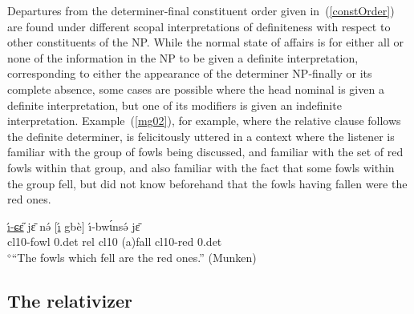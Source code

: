 \documentclass[10pt,twoside]{article}
\makeatletter
\newcommand{\cl}[1]{{\sc cl#1}}
\def\elicited{$^\diamond$}
\renewcommand{\i}{ı}
\def\@{ə}
\def\eh{ɛ}
\def\ih{ɩ}
\def\sh{ɕ}
\makeatother
\begin{document}
Departures from the determiner-final
constituent order given in~(\ref{constOrder})
are found
under different scopal interpretations of definiteness
with respect to other constituents of the NP. While the normal state
of affairs is for either all or none of the information in the NP to
be given a definite interpretation, corresponding to 
either the appearance of the determiner NP-finally or its complete absence,
some cases are possible where the
head nominal is given a definite interpretation, but one of its modifiers
is given an indefinite interpretation.
Example~(\ref{mg02}), for example, where the relative clause follows
the definite determiner, is felicitously uttered in a context where
the listener is familiar with the group of fowls being discussed, 
and familiar with the set of red fowls within that group, and also
familiar with the fact that some fowls within the group fell, 
but did not know beforehand that the fowls having fallen were the red
ones.
%
\begin{exe}
\ex \gll \uline{\'\i-\sh\H{\eh}} j\={\eh} n\'{\@} $[$\uline{\'{\i}} gb\`e$]$ \'\i-bw\'{\ih}ns\'{\@} j\={\eh}	\\
\cl10-fowl {\sc \cl10.det} {\sc rel} \cl10 ({\sc a})fall \cl10-red {\sc \cl10.det}	\\
\glt \elicited``The fowls which fell are the red ones.'' (Munken)	\label{mg02}
\end{exe}
%

\subsection{The relativizer}\label{secMungbamRelativizer}
%
\end{document}
